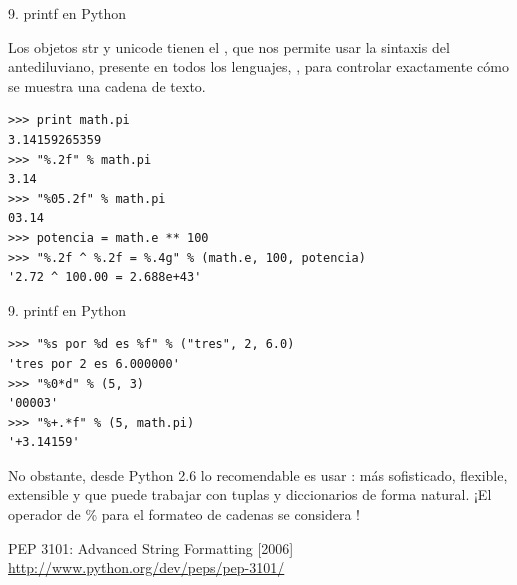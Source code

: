 \documentclass[14pt]{beamer}
\begin{document}
\begin{frame}[fragile]{9. printf en Python}
  \small
  \begin{block}{}
    \centering
    Los objetos str y unicode tienen el , que
    nos permite usar la sintaxis del antediluviano, presente en todos
    los lenguajes, , para controlar exactamente
    cómo se muestra una cadena de texto.
  \end{block}

  \footnotesize
  \begin{exampleblock}{}
    \begin{lstlisting}
>>> print math.pi
3.14159265359
>>> "%.2f" % math.pi
3.14
>>> "%05.2f" % math.pi
03.14
>>> potencia = math.e ** 100
>>> "%.2f ^ %.2f = %.4g" % (math.e, 100, potencia)
'2.72 ^ 100.00 = 2.688e+43'
    \end{lstlisting}
  \end{exampleblock}
\end{frame}

\begin{frame}[fragile]{9. printf en Python}
  \footnotesize
  \begin{exampleblock}{}
    \begin{lstlisting}
>>> "%s por %d es %f" % ("tres", 2, 6.0)
'tres por 2 es 6.000000'
>>> "%0*d" % (5, 3)
'00003'
>>> "%+.*f" % (5, math.pi)
'+3.14159'
    \end{lstlisting}
  \end{exampleblock}

  \begin{alertblock}{}
    \centering
    \small
    No obstante, desde Python 2.6 lo recomendable es usar
    : más sofisticado, flexible, extensible y
    que puede trabajar con tuplas y diccionarios de forma natural. ¡El
    operador de \% para el formateo de cadenas se considera
    !
  \end{alertblock}

  \begin{block}
    {\centering PEP 3101: Advanced String Formatting [2006]}
    \centering \url{http://www.python.org/dev/peps/pep-3101/}
  \end{block}
\end{frame}
\end{document}
